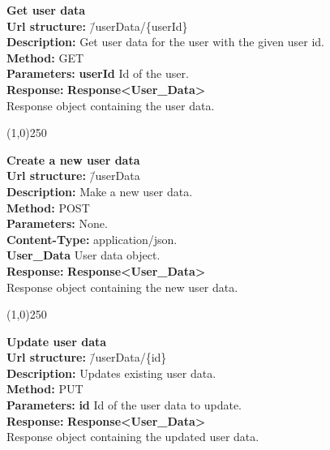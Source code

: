 \documentclass[11pt]{article}
\begin{document}
\begin{tabbing}
\textbf{Get user data} \\
\textcolor{black!60}{\textbf{Url structure:}} \hspace{0.2in} \= /userData/\{userId\} \\
\textcolor{black!60}{\textbf{Description:}}  \> Get user data for the user with the given user id. \\
\textcolor{black!60}{\textbf{Method:}} \> GET \\
\textcolor{black!60}{\textbf{Parameters:}} \> \textbf{userId} Id of the user. \\
\textcolor{black!60}{\textbf{Response:}} \> \textbf{Response<User\_Data>} \\
\> Response object containing the user data.
\end{tabbing}

\begin{center}\line(1,0){250}\end{center}

\begin{tabbing}
\textbf{Create a new user data} \\
\textcolor{black!60}{\textbf{Url structure:}} \hspace{0.2in} \= /userData \\
\textcolor{black!60}{\textbf{Description:}}  \> Make a new user data. \\
\textcolor{black!60}{\textbf{Method:}} \> POST \\
\textcolor{black!60}{\textbf{Parameters:}} \> None. \\
\textcolor{black!60}{\textbf{Content-Type:}} \> application/json. \\
\> \textbf{User\_Data} User data object. \\
\textcolor{black!60}{\textbf{Response:}} \> \textbf{Response<User\_Data>} \\
\> Response object containing the new user data.
\end{tabbing}

\begin{center}\line(1,0){250}\end{center}

\begin{tabbing}
\textbf{Update user data} \\
\textcolor{black!60}{\textbf{Url structure:}} \hspace{0.2in} \= /userData/\{id\} \\
\textcolor{black!60}{\textbf{Description:}}  \> Updates existing user data. \\
\textcolor{black!60}{\textbf{Method:}} \> PUT \\
\textcolor{black!60}{\textbf{Parameters:}} \> \textbf{id} Id of the user data to update. \\
\textcolor{black!60}{\textbf{Response:}} \> \textbf{Response<User\_Data>} \\
\> Response object containing the updated user data.
\end{tabbing}
\end{document}
